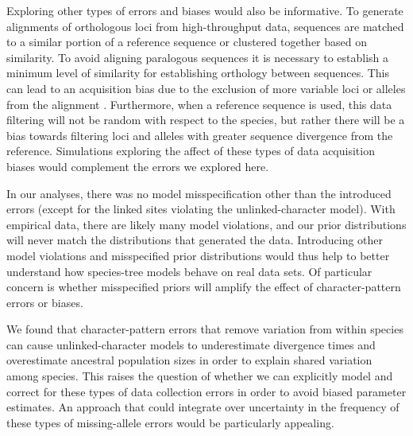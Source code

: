 Exploring other types of errors and biases would also be informative.
To generate alignments of orthologous loci from high-throughput data, 
sequences are matched to a similar portion of a reference sequence or 
clustered together based on similarity. To avoid aligning paralogous sequences 
it is necessary to establish a minimum level of similarity for establishing 
orthology between sequences. This can lead to an acquisition bias due to the 
exclusion of more variable loci or alleles from the alignment \citep{huang2016unforeseen}.
Furthermore, when a reference 
sequence is used, this data filtering will not be random with respect to the
species, but rather there will be a bias towards filtering loci and alleles
with greater sequence divergence from the reference. 
Simulations exploring the affect of these types of data acquisition biases
would complement the errors we explored here.

In our analyses, there was no model misspecification other than the introduced
errors (except for the linked sites violating the unlinked-character model).
With empirical data, there are likely many model violations,
and our prior distributions will never match the distributions that generated
the data.
Introducing other model violations and misspecified prior distributions
would thus help to better understand how species-tree models behave on real
data sets.
Of particular concern is whether misspecified priors will amplify the effect of
character-pattern errors or biases.

We found that character-pattern errors that remove variation from within
species can cause unlinked-character models to underestimate divergence
times and overestimate ancestral population sizes in order to explain shared
variation among species.
This raises the question of whether we can explicitly model and correct for
these types of data collection errors in order to avoid biased parameter
estimates.
An approach that could integrate over uncertainty in the frequency of these
types of missing-allele errors would be particularly appealing.


